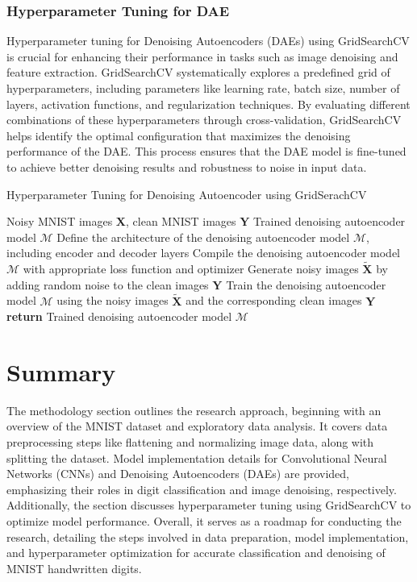 \subsubsection{Hyperparameter Tuning for DAE}
Hyperparameter tuning for Denoising Autoencoders (DAEs) using GridSearchCV is crucial for enhancing their performance in tasks such as image denoising and feature extraction. GridSearchCV systematically explores a predefined grid of hyperparameters, including parameters like learning rate, batch size, number of layers, activation functions, and regularization techniques. By evaluating different combinations of these hyperparameters through cross-validation, GridSearchCV helps identify the optimal configuration that maximizes the denoising performance of the DAE. This process ensures that the DAE model is fine-tuned to achieve better denoising results and robustness to noise in input data.

\begin{algorithm}
    \caption{Hyperparameter Tuning for Denoising Autoencoder using GridSerachCV}
    \begin{algorithmic}[1]
        \Require Noisy MNIST images $\mathbf{X}$, clean MNIST images $\mathbf{Y}$
        \Ensure Trained denoising autoencoder model $\mathcal{M}$
        \State Define the architecture of the denoising autoencoder model $\mathcal{M}$, including encoder and decoder layers
        \State Compile the denoising autoencoder model $\mathcal{M}$ with appropriate loss function and optimizer
        \State Generate noisy images $\tilde{\mathbf{X}}$ by adding random noise to the clean images $\mathbf{Y}$
        \State Train the denoising autoencoder model $\mathcal{M}$ using the noisy images $\tilde{\mathbf{X}}$ and the corresponding clean images $\mathbf{Y}$
        \State \textbf{return} Trained denoising autoencoder model $\mathcal{M}$
    \end{algorithmic}
\end{algorithm}

\section{Summary}
The methodology section outlines the research approach, beginning with an overview of the MNIST dataset and exploratory data analysis. It covers data preprocessing steps like flattening and normalizing image data, along with splitting the dataset. Model implementation details for Convolutional Neural Networks (CNNs) and Denoising Autoencoders (DAEs) are provided, emphasizing their roles in digit classification and image denoising, respectively. Additionally, the section discusses hyperparameter tuning using GridSearchCV to optimize model performance. Overall, it serves as a roadmap for conducting the research, detailing the steps involved in data preparation, model implementation, and hyperparameter optimization for accurate classification and denoising of MNIST handwritten digits.